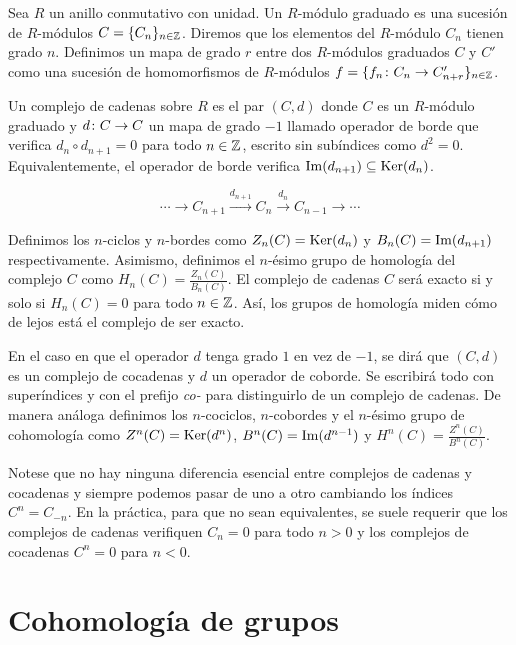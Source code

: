 Sea $R$ un anillo conmutativo con unidad. Un $R$-módulo graduado es una sucesión de $R$-módulos $C=\{C_n\}_{n\in\mathbb{Z}}$. Diremos que los elementos del $R$-módulo $C_n$ tienen grado $n$.
Definimos un mapa de grado $r$ entre dos $R$-módulos graduados $C$ y $C'$ como una sucesión de homomorfismos de $R$-módulos $f=\{f_n\colon C_n\to C_{n+r}'\}_{n\in\mathbb{Z}}$.

Un complejo de cadenas sobre $R$ es el par $(C,d)$ donde $C$ es un $R$-módulo graduado y $d\colon C\to C$ un mapa de grado $-1$ llamado operador de borde que verifica $d_{n}\circ d_{n+1}=0$ para todo $n\in\mathbb{Z}$, escrito sin subíndices como $d^2 = 0$. Equivalentemente, el operador de borde verifica $\operatorname{Im}(d_{n+1})\subseteq \operatorname{Ker}(d_{n})$.

\begin{equation}
	\cdots  \xrightarrow{} C_{n+1} \xrightarrow{d_{n+1}} C_n \xrightarrow{d_n} C_{n-1} \xrightarrow{} \cdots 
\end{equation}

Definimos los $n$-ciclos y $n$-bordes como $Z_n(C)=\operatorname{Ker}(d_{n})$ y $B_n(C)=\operatorname{Im}(d_{n+1})$ respectivamente. Asimismo, definimos el $n$-ésimo grupo de homología del complejo $C$ como $H_n(C) = \frac{Z_n(C)}{B_n(C)}$. El complejo de cadenas $C$ será exacto si y solo si $H_n(C) = 0$ para todo $n\in\mathbb{Z}$. Así, los grupos de homología miden cómo de lejos está el complejo de ser exacto.

En el caso en que el operador $d$ tenga grado $1$ en vez de $-1$, se dirá que $(C,d)$ es un complejo de cocadenas y $d$ un operador de coborde. Se escribirá todo con superíndices y con el prefijo \textit{co-} para distinguirlo de un complejo de cadenas. De manera análoga definimos los $n$-cociclos, $n$-cobordes y el $n$-ésimo grupo de cohomología como $Z^n(C)=\operatorname{Ker}(d^n)$, $B^n(C)=\operatorname{Im}(d^{n-1})$ y $H^n(C)=\frac{Z^n(C)}{B^n(C)}$.

Notese que no hay ninguna diferencia esencial entre complejos de cadenas y cocadenas y siempre podemos pasar de uno a otro cambiando los índices $C^n = C_{-n}$. En la práctica, para que no sean equivalentes, se suele requerir que los complejos de cadenas verifiquen $C_n = 0$ para todo $n>0$ y los complejos de cocadenas $C^n=0$ para $n<0$.

\section{Cohomología de grupos}

